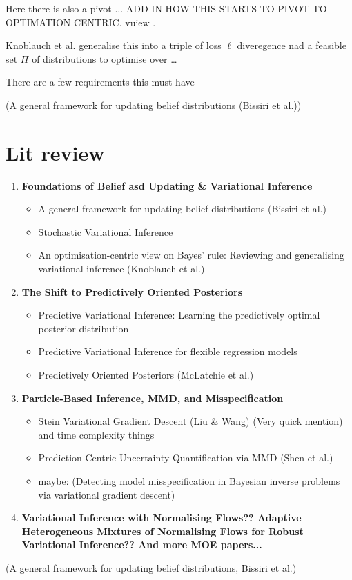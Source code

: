 \documentclass[11pt,a4paper]{article}
\begin{document}
Here there is also a pivot ... ADD IN HOW THIS STARTS TO PIVOT TO OPTIMATION CENTRIC. vuiew .

Knoblauch et al. generalise this into a triple of loss $\ell$ diveregence nad a feasible set $\Pi$ of distributions to optimise over \dots







There are a few requirements this must have



(A general framework for updating belief distributions (Bissiri et al.))

\section{Lit review}


\begin{enumerate}
    \item \textbf{Foundations of Belief asd Updating \& Variational Inference}
          \begin{itemize}
              \item A general framework for updating belief distributions (Bissiri et al.)
              \item Stochastic Variational Inference
              \item An optimisation-centric view on Bayes' rule: Reviewing and generalising variational inference (Knoblauch et al.)
          \end{itemize}

    \item \textbf{The Shift to Predictively Oriented Posteriors}
          \begin{itemize}
              \item Predictive Variational Inference: Learning the predictively optimal posterior distribution
              \item Predictive Variational Inference for flexible regression models
              \item Predictively Oriented Posteriors (McLatchie et al.)
          \end{itemize}

    \item \textbf{Particle-Based Inference, MMD, and Misspecification}
          \begin{itemize}
              \item Stein Variational Gradient Descent (Liu \& Wang) (Very quick mention) and time complexity things
              \item Prediction-Centric Uncertainty Quantification via MMD (Shen et al.)
              \item maybe: (Detecting model misspecification in Bayesian inverse problems via variational gradient descent)
          \end{itemize}

    \item \textbf{Variational Inference with Normalising Flows?? Adaptive Heterogeneous Mixtures of Normalising Flows for Robust Variational Inference?? And more MOE papers...}
\end{enumerate}


(A general framework for updating belief distributions, Bissiri et al.)
\end{document}
